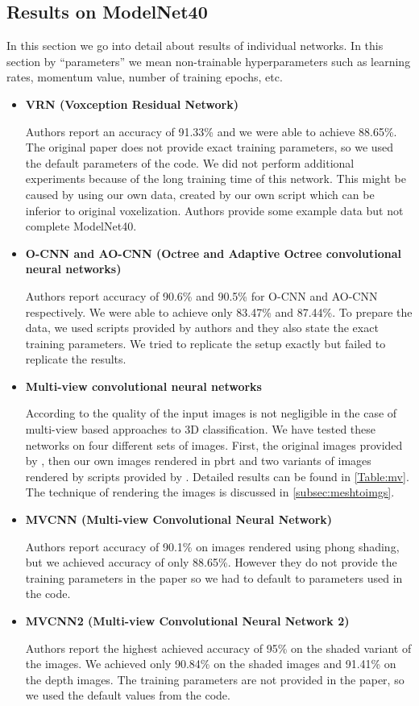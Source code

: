 \subsection{Results on ModelNet40}
In this section we go into detail about results of individual networks. In this section by “parameters” we mean non-trainable hyperparameters such as learning rates, momentum value, number of training epochs, etc.

\def\myitem #1#2{
	\item { \textbf{#1} \par #2
	}
}

\begin{itemize}
	\myitem{VRN (Voxception Residual Network)}{	Authors report an accuracy of 91.33\% and we were able to achieve 88.65\%. The original paper does not provide exact training parameters, so we used the default parameters of the code. We did not perform additional experiments because of the long training time of this network. This might be caused by using our own data, created by our own script which can be inferior to original voxelization. Authors provide some example data but not complete ModelNet40.}
	\myitem {O-CNN and AO-CNN (Octree and Adaptive Octree convolutional neural networks)}{Authors report accuracy of 90.6\% and 90.5\% for O-CNN and AO-CNN respectively. We were able to achieve only 83.47\% and 87.44\%. To prepare the data, we used scripts provided by authors and they also state the exact training parameters. We tried to replicate the setup exactly but failed to replicate the results.} 
	\myitem{Multi-view convolutional neural networks}{According to \cite{su_deeper_2018} the quality of the input images is not negligible in the case of multi-view based approaches to 3D classification. We have tested these networks on four different sets of images. First, the original images provided by \cite{su_multi-view_2015}, then our own images rendered in pbrt and two variants of images rendered by scripts provided by \cite{su_deeper_2018}.  Detailed results can be found in \autoref{Table:mv}. The technique of rendering the images is discussed in \autoref{subsec:meshtoimgs}.}
	
	
	\myitem{MVCNN (Multi-view Convolutional Neural Network)}{Authors report accuracy of 90.1\% on images rendered using phong shading, but we achieved accuracy of only 88.65\%. However they do not provide the training parameters in the paper so we had to default to parameters used in the code.}
	
	\myitem{MVCNN2 (Multi-view Convolutional Neural Network 2)}{Authors report the highest achieved accuracy of 95\% on the shaded variant of the images. We achieved only 90.84\% on the shaded images and 91.41\% on the depth images. The training parameters are not provided in the paper, so we used the default values from the code.}
	

\end{itemize}
